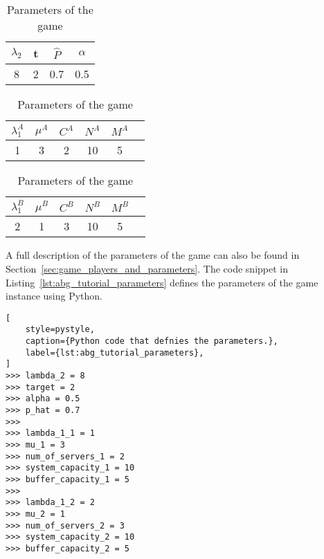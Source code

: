 \begin{table}[H]
    \begin{center}
        \begin{tabular}{||c|c|c|c||}
            \hline
            \(\lambda_2\) & t & \footnotesize{\(\hat{P}\)} & \(\alpha\) \\
            \hline\hline
            8 & 2 & 0.7 & 0.5 \\
            \hline
        \end{tabular}

        \vspace{0.3cm}

        \begin{tabular}{||c|c|c|c|c|c||}
            \hline
            \(\lambda_1^A\) & \(\mu^A\) & \(C^A\) & \(N^A\) & \(M^A\) \\
            \hline\hline
            1 & 3 & 2 & 10 & 5 \\
            \hline
        \end{tabular}

        \vspace{0.3cm}
        
        \begin{tabular}{||c|c|c|c|c|c||}
            \hline
            \(\lambda_1^B\) & \(\mu^B\) & \(C^B\) & \(N^B\) & \(M^B\) \\
            \hline\hline
            2 & 1 & 3 & 10 & 5 \\
            \hline
        \end{tabular}
    \end{center}
    \label{tab:ambulance_game_example}
    \caption{Parameters of the game}
\end{table}

A full description of the parameters of the game can also be found in
Section~\ref{sec:game_players_and_parameters}.
The code snippet in Listing~\ref{lst:abg_tutorial_parameters} defines the
parameters of the game instance using Python.

\begin{lstlisting}[
    style=pystyle,
    caption={Python code that defnies the parameters.},
    label={lst:abg_tutorial_parameters},
]
>>> lambda_2 = 8
>>> target = 2
>>> alpha = 0.5
>>> p_hat = 0.7
>>>
>>> lambda_1_1 = 1
>>> mu_1 = 3
>>> num_of_servers_1 = 2
>>> system_capacity_1 = 10
>>> buffer_capacity_1 = 5
>>>
>>> lambda_1_2 = 2
>>> mu_2 = 1
>>> num_of_servers_2 = 3
>>> system_capacity_2 = 10
>>> buffer_capacity_2 = 5

\end{lstlisting}

